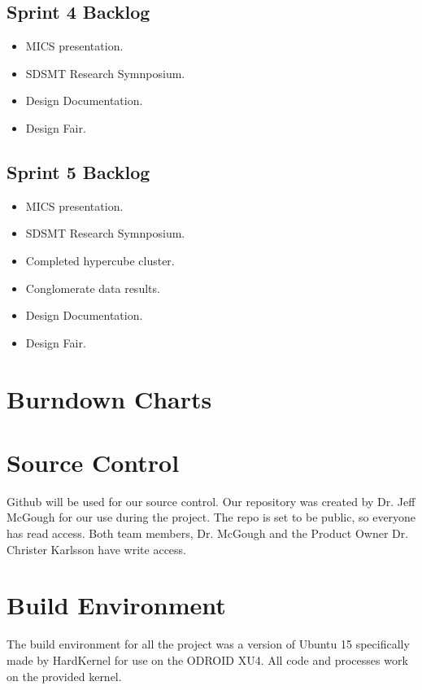 \subsection*{Sprint 4 Backlog}
\begin{itemize}
	\item MICS presentation.
	\item SDSMT Research Symnposium. 
	\item Design Documentation.
	\item Design Fair.
\end{itemize}

\subsection*{Sprint 5 Backlog}
\begin{itemize}
	\item MICS presentation.
	\item SDSMT Research Symnposium.
	\item Completed hypercube cluster.
	\item Conglomerate data results.
	\item Design Documentation.
	\item Design Fair.
\end{itemize}

\section{Burndown Charts}



\section{Source  Control}

Github will be used for our source control. Our repository was created by Dr. Jeff McGough for our use during the project. The repo is set to be public, so everyone has read access. Both team members, Dr. McGough and the Product Owner Dr. Christer Karlsson have write access.

\section{Build  Environment}

The build environment for all the project was a version of Ubuntu 15 specifically made by HardKernel for use on the ODROID XU4. All code and processes work on the provided kernel.
